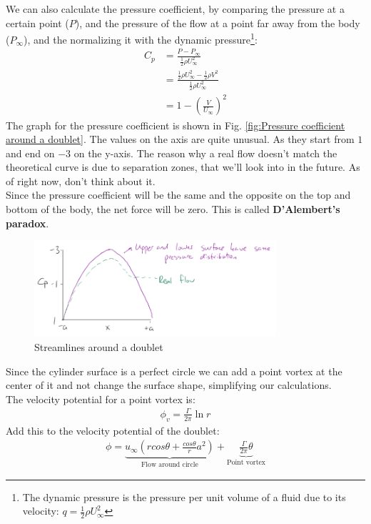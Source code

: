 \documentclass{article}
\begin{document}
We can also calculate the pressure coefficient, by comparing the pressure at a certain point ($P$), and the pressure of the flow at a point far away from the body ($P_\infty$), and the normalizing it with the dynamic pressure\footnote{The dynamic pressure is the pressure per unit volume of a fluid due to its velocity: $q=\frac{1}{2}\rho U_{\infty}^2$}:
\begin{align*}
    C_p&=\frac{P-P_\infty}{\frac{1}{2}\rho U_\infty^2}\\
    &=\frac{\frac{1}{2}\rho U_{\infty}^2 - \frac{1}{2}\rho V^2}{\frac{1}{2}\rho U_\infty^2}\\
    &=1-\left(\frac{V}{U_\infty}\right)^2
\end{align*}
The graph for the pressure coefficient is shown in Fig. \ref{fig:Pressure coefficient around a doublet}. The values on the axis are quite unusual. As they start from $1$ and end on $-3$ on the y-axis. The reason why a real flow doesn't match the theoretical curve is due to separation zones, that we'll look into in the future. As of right now, don't think about it.\\
Since the pressure coefficient will be the same and the opposite on the top and bottom of the body, the net force will be zero. This is called \textbf{D'Alembert's paradox}.\\
\begin{figure}
    \centering
    \includegraphics[width=0.8\textwidth]{Pressure coefficient around a doublet.png}
    \caption{Streamlines around a doublet}
    \label{fig:Pressure coefficient around a doublet.png}
\end{figure}
Since the cylinder surface is a perfect circle we can add a point vortex at the center of it and not change the surface shape, simplifying our calculations.\\
The velocity potential for a point vortex is:
\begin{align*}
    \phi_v=\frac{\Gamma}{2\pi}\ln r
\end{align*}
Add this to the velocity potential of the doublet:
\begin{align*}
    \phi=\underbrace{u_{\infty}(rcos\theta + \frac{cos\theta}{r}a^2)}_\text{Flow around circle}+\underbrace{\frac{\Gamma}{2\pi}\theta}_\text{Point vortex}
\end{align*}
\end{document}
